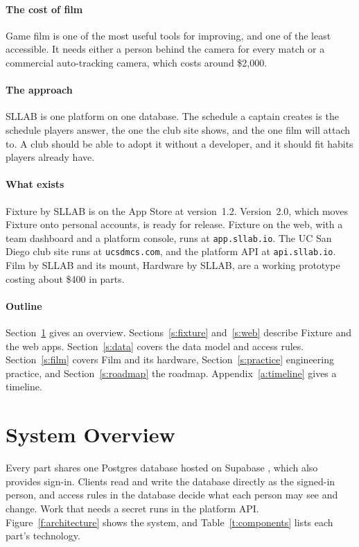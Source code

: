 \documentclass[letterpaper,11pt]{article}
\newcommand{\code}[1]{\texttt{#1}}
\begin{document}
\paragraph{The cost of film} Game film is one of the most useful tools for improving, and one of
the least accessible. It needs either a person behind the camera for every match or a commercial
auto-tracking camera, which costs around \$2{,}000.

\paragraph{The approach} SLLAB is one platform on one database. The schedule a captain creates is
the schedule players answer, the one the club site shows, and the one film will attach to. A club
should be able to adopt it without a developer, and it should fit habits players already have.

\paragraph{What exists} Fixture by SLLAB is on the App Store at version~1.2. Version~2.0, which
moves Fixture onto personal accounts, is ready for release. Fixture on the web, with a team
dashboard and a platform console, runs at \code{app.sllab.io}. The UC San Diego club site runs at
\code{ucsdmcs.com}, and the platform API at \code{api.sllab.io}. Film by SLLAB and its mount,
Hardware by SLLAB, are a working prototype costing about \$400 in parts.

\paragraph{Outline} Section~\ref{s:overview} gives an overview. Sections~\ref{s:fixture}
and~\ref{s:web} describe Fixture and the web apps. Section~\ref{s:data} covers the data model and
access rules. Section~\ref{s:film} covers Film and its hardware, Section~\ref{s:practice}
engineering practice, and Section~\ref{s:roadmap} the roadmap. Appendix~\ref{a:timeline} gives a
timeline.

\section{System Overview}\label{s:overview}

Every part shares one Postgres database hosted on Supabase \citep{Supabase}, which also provides
sign-in. Clients read and write the database directly as the signed-in person, and access rules
in the database decide what each person may see and change. Work that needs a secret runs in the
platform API. Figure~\ref{f:architecture} shows the system, and Table~\ref{t:components} lists
each part's technology.
\end{document}
